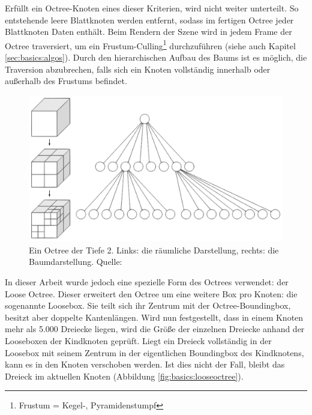 Erfüllt ein Octree-Knoten eines dieser Kriterien, wird nicht weiter unterteilt. So entstehende leere Blattknoten werden entfernt, sodass im fertigen Octree jeder Blattknoten Daten enthält. Beim Rendern der Szene wird in jedem Frame der Octree traversiert, um ein Frustum-Culling\footnote{Frustum = Kegel-, Pyramidenstumpf} durchzuführen (siehe auch Kapitel \ref{sec:basics:algos}). Durch den hierarchischen Aufbau des Baums ist es möglich, die Traversion abzubrechen, falls sich ein Knoten vollständig innerhalb oder außerhalb des Frustums befindet.

\begin{figure}
 \centering
  \includegraphics[scale=0.5]{images/octree.pdf}
  \caption[Ein Octree]{Ein Octree der Tiefe 2. Links: die räumliche Darstellung, rechts: die Baumdarstellung. Quelle:}
 \label{fig:basics:octree}
\end{figure}
In dieser Arbeit wurde jedoch eine spezielle Form des Octrees verwendet: der Loose Octree. Dieser erweitert den Octree um eine weitere Box pro Knoten: die sogenannte Loosebox. Sie teilt sich ihr Zentrum mit der Octree-Boundingbox, besitzt aber doppelte Kantenlängen. Wird nun festgestellt, dass in einem Knoten mehr als 5.000 Dreiecke liegen, wird die Größe der einzelnen Dreiecke anhand der Looseboxen der Kindknoten geprüft. Liegt ein Dreieck vollständig in der Loosebox mit seinem Zentrum in der eigentlichen Boundingbox des Kindknotens, kann es in den Knoten verschoben werden. Ist dies nicht der Fall, bleibt das Dreieck im aktuellen Knoten (Abbildung \ref{fig:basics:looseoctree}).


